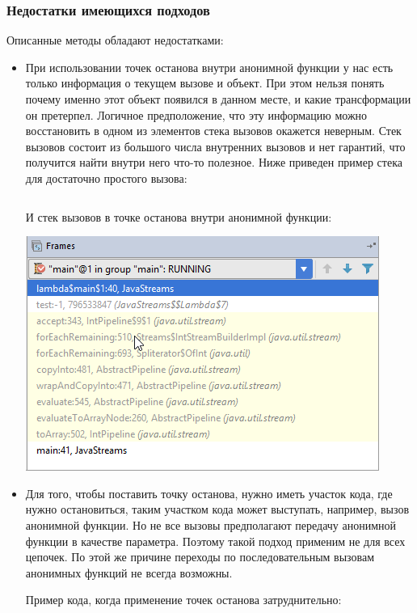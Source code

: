 \subsubsection{Недостатки имеющихся подходов}
Описанные методы обладают недостатками:
\begin{itemize}
	\item При использовании точек останова внутри анонимной функции у нас есть только информация о текущем вызове и объект. При этом нельзя понять почему именно этот объект появился в данном месте, и какие трансформации он претерпел. Логичное предположение, что эту информацию можно восстановить в одном из элементов стека вызовов окажется неверным. Стек вызовов состоит из большого числа внутренних вызовов и нет гарантий, что получится найти внутри него что-то полезное. Ниже приведен пример стека для достаточно простого вызова:
	\inputminted{java}{chapter1/code/SimplestStreamExample.java}
	
	И стек вызовов в точке останова внутри анонимной функции:
	
	\includegraphics[scale=1.]{chapter1/img/stack.png}
	
	\item Для того, чтобы поставить точку останова, нужно иметь участок кода, где нужно остановиться, таким участком кода может выступать, например, вызов анонимной функции. Но не все вызовы предполагают передачу анонимной функции в качестве параметра. Поэтому такой подход применим не для всех цепочек. По этой же причине переходы по последовательным вызовам анонимных функций не всегда возможны.
	
	Пример кода, когда применение точек останова затруднительно: \inputminted{java}{chapter1/code/HardToUseBreakpoint.java}
\end{itemize}


